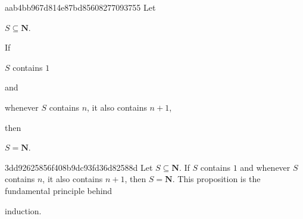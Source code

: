 \begin{note}{aab4bb967d814e87bd85608277093755}
    Let \begin{icloze}{3}\({ S \subseteq \mathbf{N} }\).\end{icloze}
    If \begin{icloze}{2}\({ S }\) contains \({ 1 }\)\end{icloze} and \begin{icloze}{2}whenever \({ S }\) contains \({ n }\), it also contains \({ n + 1 }\),\end{icloze} then \begin{icloze}{1}\({ S = \mathbf{N} }\).\end{icloze}
\end{note}

\begin{note}{3dd92625856f408b9dc93fd36d82588d}
    Let \({ S \subseteq \mathbf{N} }\).
    If \({ S }\) contains \({ 1 }\) and whenever \({ S }\) contains \({ n }\), it also contains \({ n + 1 }\), then \({ S = \mathbf{N} }\).
    This proposition is the fundamental principle behind \begin{icloze}{1}induction.\end{icloze}
\end{note}


